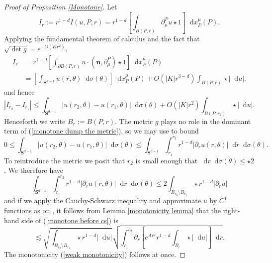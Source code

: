 \documentclass[reqno,11pt]{amsart}
\newcommand{\Sph}{\mathbf S}
\newcommand*\dif{\mathop{}\!\mathrm{d}}
\newcommand{\normal}{\mathbf n}
\theoremstyle{definition}
\numberwithin{equation}{section}
\begin{document}
\begin{proof}[Proof of Proposition \ref{Monotone}]
Let
$$I_r := r^{1 - d} I(u, P, r) = r^{1 - d} \left[\int_{B(P, r)} \partial_\mu^P u \star 1\right] \dif x^\mu_P(P).$$
Applying the fundamental theorem of calculus and the fact that $\sqrt{\det g} = e^{-O(Kr^2)}$,
\begin{align*}
I_r &= r^{1 - d} \left[\int_{\partial B(P, r)} u \cdot (\normal, \partial_\mu^P) \star 1\right] \dif x^\mu_P(P) \\
&= \left[\int_{\Sph^{d - 1}} u(r, \theta) \dif \sigma(\theta)\right] \dif x^\mu_P(P) + O(|K|r^{3 - d}) \int_{B(P, r)} \star |\dif u|.
\end{align*}
and hence
\begin{equation}\label{monotone dump the metric}
|I_{r_2} - I_{r_1}| \leq \int_{\Sph^{d - 1}} |u(r_2, \theta) - u(r_1, \theta)| \dif \sigma(\theta) + O(|K|r^2) \int_{B(P, r_2)} \star |\dif u|.
\end{equation}
Henceforth we write $B_r := B(P, r)$.
The metric $g$ plays no role in the dominant term of (\ref{monotone dump the metric}), so we may use \cite[Lemma 5.3]{Giusti77} to bound
$$0 \leq \int_{\Sph^{d - 1}} |u(r_2, \theta) - u(r_1, \theta)| \dif \sigma(\theta) \leq \int_{\Sph^{d - 1}} \int_{r_1}^{r_2} r^{1 - d}|\partial_r u(r, \theta)| \dif r \dif\sigma(\theta).$$
To reintroduce the metric we posit that $r_2$ is small enough that $\dif r \dif \sigma(\theta) \leq \star 2$.
We therefore have
\begin{equation}\label{monotone before cs}
\int_{\Sph^{d - 1}} \int_{r_1}^{r_2} r^{1 - d}|\partial_r u(r, \theta)| \dif r \dif\sigma(\theta) \leq 2 \int_{B_{r_2} \setminus B_{r_1}} \star r^{1 - d}|\partial_r u|
\end{equation}
and if we apply the Cauchy-Schwarz inequality and approximate $u$ by $C^1$ functions as on \cite[pg68]{Giusti77}, it follows from Lemma \ref{monotonicity lemma} that the right-hand side of (\ref{monotone before cs}) is
$$\lesssim \sqrt{\int_{B_{r_2} \setminus B_{r_1}} \star r^{1 - d} |\dif u|} \sqrt{\int_{r_1}^{r_2} \partial_r \left[e^{Ar^2} r^{1-d}\int_{B_r} \star |\dif u|\right] \dif r}.$$
The monotonicity (\ref{weak monotonicity}) follows at once.


\end{proof}
\end{document}
